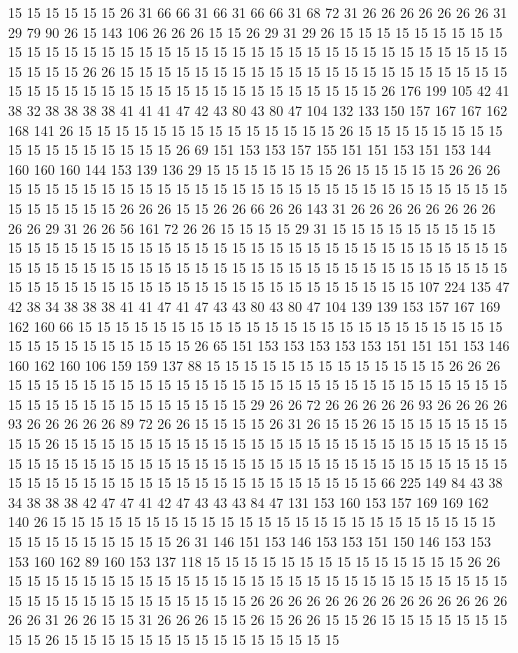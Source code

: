 15 15 15 15 15 15 26 31 66 66 31 66 31 66 66 31 68 72 31 26
26 26 26 26 26 26 31 29 79 90 26 15 143 106 26 26 26 15 15 26
29 31 29 26 15 15 15 15 15 15 15 15 15 15 15 15 15 15 15 15
15 15 15 15 15 15 15 15 15 15 15 15 15 15 15 15 15 15 15 15
15 15 15 15 26 26 15 15 15 15 15 15 15 15 15 15 15 15 15 15
15 15 15 15 15 15 15 15 15 15 15 15 15 15 15 15 15 15 15 15
15 15 15 15 15 15 15 26 176 199 105 42 41 38 32 38 38 38 38 41
41 41 47 42 43 80 43 80 47 104 132 133 150 157 167 167 162 168 141 26
15 15 15 15 15 15 15 15 15 15 15 15 15 15 26 15 15 15 15 15
15 15 15 15 15 15 15 15 15 15 15 15 26 69 151 153 153 157 155 151
151 153 151 153 144 160 160 160 144 153 139 136 29 15 15 15 15 15 15 15
26 15 15 15 15 15 26 26 26 15 15 15 15 15 15 15 15 15 15 15
15 15 15 15 15 15 15 15 15 15 15 15 15 15 15 15 15 15 15 15
15 15 26 26 26 15 15 26 26 66 26 26 143 31 26 26 26 26 26 26
26 26 26 26 29 31 26 26 56 161 72 26 26 15 15 15 15 29 31 15
15 15 15 15 15 15 15 15 15 15 15 15 15 15 15 15 15 15 15 15
15 15 15 15 15 15 15 15 15 15 15 15 15 15 15 15 15 15 15 15
15 15 15 15 15 15 15 15 15 15 15 15 15 15 15 15 15 15 15 15
15 15 15 15 15 15 15 15 15 15 15 15 15 15 15 15 15 15 15 15
15 15 15 15 107 224 135 47 42 38 34 38 38 38 41 41 47 41 47 43
43 80 43 80 47 104 139 139 153 157 167 169 162 160 66 15 15 15 15 15
15 15 15 15 15 15 15 15 15 15 15 15 15 15 15 15 15 15 15 15
15 15 15 15 15 15 15 15 26 65 151 153 153 153 153 153 151 151 151 153
146 160 162 160 106 159 159 137 88 15 15 15 15 15 15 15 15 15 15 15
15 15 26 26 26 15 15 15 15 15 15 15 15 15 15 15 15 15 15 15
15 15 15 15 15 15 15 15 15 15 15 15 15 15 15 15 15 15 15 15
15 15 15 15 15 29 26 26 72 26 26 26 26 26 93 26 26 26 26 93
26 26 26 26 26 89 72 26 26 15 15 15 15 26 31 26 15 15 26 15
15 15 15 15 15 15 15 15 26 15 15 15 15 15 15 15 15 15 15 15
15 15 15 15 15 15 15 15 15 15 15 15 15 15 15 15 15 15 15 15
15 15 15 15 15 15 15 15 15 15 15 15 15 15 15 15 15 15 15 15
15 15 15 15 15 15 15 15 15 15 15 15 15 15 15 15 15 15 15 15
66 225 149 84 43 38 34 38 38 38 42 47 47 41 42 47 43 43 43 84
47 131 153 160 153 157 169 169 162 140 26 15 15 15 15 15 15 15 15 15
15 15 15 15 15 15 15 15 15 15 15 15 15 15 15 15 15 15 15 15
15 15 15 15 26 31 146 151 153 146 153 153 151 150 146 153 153 153 160 162
89 160 153 137 118 15 15 15 15 15 15 15 15 15 15 15 15 15 15 26
26 15 15 15 15 15 15 15 15 15 15 15 15 15 15 15 15 15 15 15
15 15 15 15 15 15 15 15 15 15 15 15 15 15 15 15 15 15 15 15
15 26 26 26 26 26 26 26 26 26 26 26 26 26 26 26 26 31 26 26
15 15 31 26 26 26 15 15 26 15 26 26 15 15 26 15 15 15 15 15
15 15 15 15 26 15 15 15 15 15 15 15 15 15 15 15 15 15 15 15
